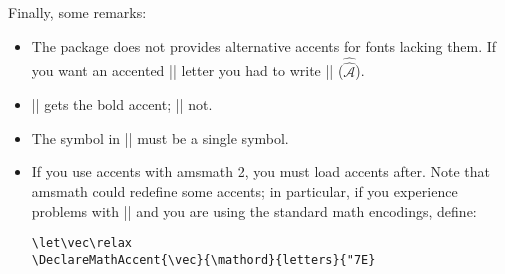 \documentclass{ltxguide}
\begin{document}
Finally, some remarks:
\begin{itemize}
\item The package does not provides alternative accents for fonts
  lacking them. If you want an accented  |\mathcal| letter you had to
  write || ($\hat{\hat{\mathcal{A}}}$).
\item || gets the bold accent;
 || not.
\item The symbol in |\accentset| must be a single symbol.
\item If you use \textsf{accents} with \textsf{amsmath} 2, you must
load \textsf{accents} after. Note that \textsf{amsmath} could redefine
some accents; in particular, if you experience problems with |\vec|
and you are using the standard math encodings, define:
\begin{verbatim}
\let\vec\relax
\DeclareMathAccent{\vec}{\mathord}{letters}{"7E}
\end{verbatim}
\end{itemize}
\end{document}
